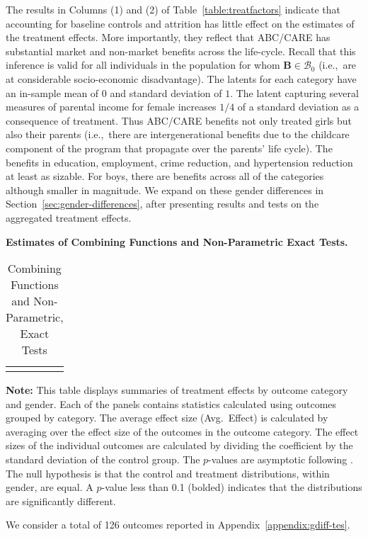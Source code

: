 The results in  Columns (1) and (2) of Table~\ref{table:treatfactors} indicate that accounting for baseline controls and attrition has little effect on the estimates of the treatment effects. More importantly, they reflect that ABC/CARE has substantial market and non-market benefits across the life-cycle. Recall that this inference is valid for all individuals in the population for whom $\bm{B} \in \mathcal{B}_0$ (i.e.,\ are at considerable socio-economic disadvantage). The latents for each category have an in-sample mean of $0$ and standard deviation of $1$. The latent capturing several measures of parental income for female increases $1/4$ of a standard deviation as a consequence of treatment. Thus ABC/CARE benefits not only treated girls but also their parents (i.e.,\ there are intergenerational benefits due to the childcare component of the program that propagate over the parents' life cycle). The benefits in education, employment, crime reduction, and hypertension reduction at least as sizable. For boys, there are benefits across all of the categories although smaller in magnitude. We expand on these gender differences in Section~\ref{sec:gender-differences}, after presenting results and tests on the aggregated treatment effects.

\textbf{Estimates of Combining Functions and Non-Parametric Exact Tests.} 

\begin{table}[!htpb]
\begin{threeparttable}
\caption{Combining Functions and Non-Parametric, Exact Tests} \label{table:massiveall}
\centering
\begin{tabularx}{16.75cm}{XcX}
&  & 
\end{tabularx}
\begin{tablenotes}
\footnotesize
\item \textbf{Note:} This table displays summaries of treatment effects by outcome category and gender. Each of the panels contains statistics calculated using outcomes grouped by category. The average effect size (Avg.\ Effect) is calculated by averaging over the effect size of the outcomes in the outcome category. The effect sizes of the individual outcomes are calculated by dividing the coefficient by the standard deviation of the control group. The $p$-values are asymptotic following \citet{Rosenbaum_2005_Distribution_JRSS}. The null hypothesis is that the control and treatment distributions, within gender, are equal. A $p$-value less than 0.1 (bolded) indicates that the distributions are significantly different. 
\end{tablenotes}
\end{threeparttable}
\end{table}




We consider a total of 126 outcomes reported in Appendix~\ref{appendix:gdiff-tes}. 







